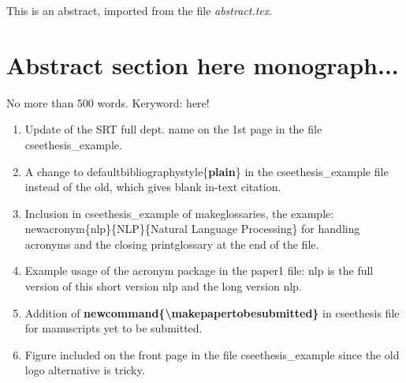 This is an abstract, imported from the file \textit{abstract.tex}.


\section*{Abstract section here monograph...}
No more than 500 words.
Keryword: here!
\begin{enumerate}
    \item Update of the SRT full dept. name on the 1st page in the file cseethesis\_example.
    
    \item A change to defaultbibliographystyle\{\textbf{plain}\} in the cseethesis\_example file instead of the old, which gives blank in-text citation.
    
    \item Inclusion in cseethesis\_example of makeglossaries, the example: \\newacronym\{nlp\}\{NLP\}\{Natural Language Processing\} for handling acronyms and the closing printglossary at the end of the file.

    \item Example usage of the acronym package in the paper1 file: \acrfull{nlp} is the full version of this short version \acrshort{nlp} and the long version \acrlong{nlp}. 
    
    \item Addition of \textbf{newcommand\{\textbackslash makepapertobesubmitted\}} in cseethesis file for manuscripts yet to be submitted.
    
    \item Figure included on the front page in the file cseethesis\_example since the old logo alternative is tricky.
\end{enumerate}